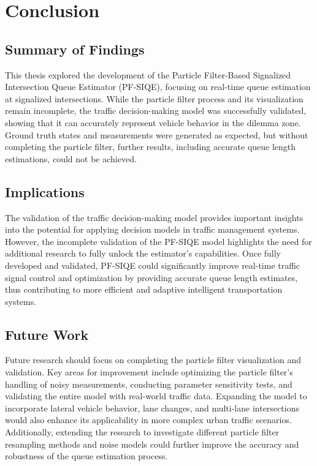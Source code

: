 \section{Conclusion}

\subsection{Summary of Findings}
This thesis explored the development of the Particle Filter-Based Signalized Intersection Queue Estimator (PF-SIQE), focusing on real-time queue estimation at signalized intersections. While the particle filter process and its visualization remain incomplete, the traffic decision-making model was successfully validated, showing that it can accurately represent vehicle behavior in the dilemma zone. Ground truth states and measurements were generated as expected, but without completing the particle filter, further results, including accurate queue length estimations, could not be achieved.

\subsection{Implications}
The validation of the traffic decision-making model provides important insights into the potential for applying decision models in traffic management systems. However, the incomplete validation of the PF-SIQE model highlights the need for additional research to fully unlock the estimator's capabilities. Once fully developed and validated, PF-SIQE could significantly improve real-time traffic signal control and optimization by providing accurate queue length estimates, thus contributing to more efficient and adaptive intelligent transportation systems.

\subsection{Future Work}
Future research should focus on completing the particle filter visualization and validation. Key areas for improvement include optimizing the particle filter’s handling of noisy measurements, conducting parameter sensitivity tests, and validating the entire model with real-world traffic data. Expanding the model to incorporate lateral vehicle behavior, lane changes, and multi-lane intersections would also enhance its applicability in more complex urban traffic scenarios. Additionally, extending the research to investigate different particle filter resampling methods and noise models could further improve the accuracy and robustness of the queue estimation process.




